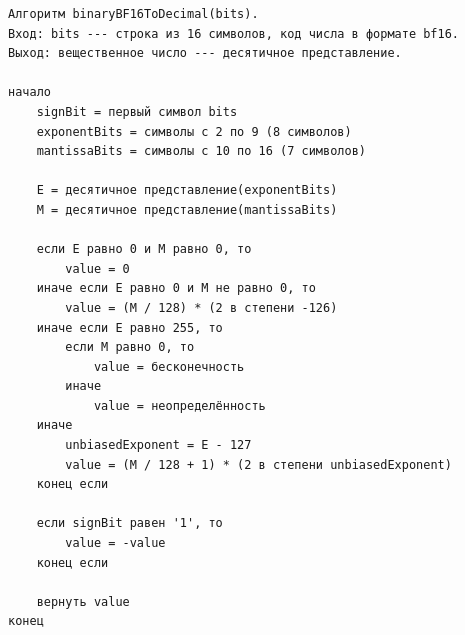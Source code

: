 \begin{verbatim}
Алгоритм binaryBF16ToDecimal(bits).
Вход: bits --- строка из 16 символов, код числа в формате bf16.
Выход: вещественное число --- десятичное представление.

начало
    signBit = первый символ bits
    exponentBits = символы с 2 по 9 (8 символов)
    mantissaBits = символы с 10 по 16 (7 символов)

    E = десятичное представление(exponentBits)
    M = десятичное представление(mantissaBits)

    если E равно 0 и M равно 0, то
        value = 0
    иначе если E равно 0 и M не равно 0, то
        value = (M / 128) * (2 в степени -126)
    иначе если E равно 255, то
        если M равно 0, то
            value = бесконечность 
        иначе
            value = неопределённость 
    иначе
        unbiasedExponent = E - 127
        value = (M / 128 + 1) * (2 в степени unbiasedExponent)
    конец если

    если signBit равен '1', то
        value = -value
    конец если

    вернуть value
конец
\end{verbatim}